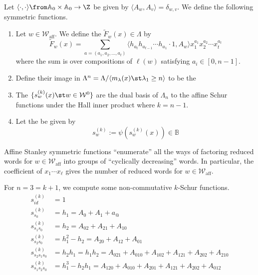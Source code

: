 \documentclass[11pt,leqno,oneside]{amsart}
\numberwithin{thm}{section}
\renewcommand{\W}{\mathcal{W}}
\newcommand{\Waff}{\W_{\text{aff}}}
\newcommand{\A}{\mathbb{A}}
\newcommand{\B}{\mathbb{B}}
\newcommand{\sym}{\Lambda}
\begin{document}
\begin{defn}\label{k-schur-def-1}
  Let \(\langle \cdot, \cdot \rangle \from \A_0 \times \A_0 \to
    \Z\) be given by \(\langle A_w, A_v \rangle = \delta_{w,v}\). We
    define the following symmetric functions.
  \begin{enumerate}
  \item Let \(w \in \Waff\). We define the  \(\tilde{F}_w(x) \in \sym\) by
    \[ \tilde{F}_w(x) = \sum_{a = (a_1, a_2, \ldots, a_t)} \langle
      h_{a_t} h_{a_{t-1}} \cdots h_{a_1} \cdot 1, A_w \rangle
      x_1^{a_1} x_2^{a_2} \cdots x_t^{a_t}
    \]
    where the sum is over compositions of \(\ell(w)\) satisfying
    \(a_i \in [0,n-1]\).
  \item Define their image in \(\sym^n = \sym/\langle m_\lambda(x) \st
    \lambda_1 \geq n\rangle\) to be the 
  \item The  \(\{s_w^{(k)}(x) \st w \in \W^0\}\)
  are the dual basis of \(\sym_n\) to the affine Schur functions under
  the Hall inner product where \(k = n-1\).
  \item Let the  be given
    by \[
      s_w^{(k)} := \psi(s_w^{(k)}(x)) \in \B
    \]
  \end{enumerate}
\end{defn}
\begin{rmk}
  Affine Stanley symmetric functions ``enumerate'' all the ways of
  factoring reduced words for \(w \in \Waff\) into groups of
  ``cyclically decreasing'' words. In particular, the coefficient of \(x_1
  \cdots x_\ell\) gives the number of reduced words for \(w \in \Waff\).
\end{rmk}
\begin{example}
  For \(n=3=k+1\), we compute some non-commutative \(k\)-Schur functions.
  \begin{align*}
    s_{id}^{(k)} & = 1 \\
    s_{s_0}^{(k)} & = h_1 = A_0+A_1+a_@ \\
    s_{s_1 s_0}^{(k)} & = h_2 = A_{02}+A_{21}+A_{10}\\
    s_{s_2 s_0}^{(k)} & = h_1^2-h_2=A_{20}+A_{12}+A_{01}\\
    s_{s_2 s_1 s_0}^{(k)} & = h_2h_1 = h_1 h_2 = A_{021}+A_{010}+A_{102}+A_{121}+A_{202}+A_{210}\\
    s_{s_1 s_2 s_0}^{(k)} & = h_1^3-h_2 h_1 = A_{120}+A_{010}+A_{201}+A_{121}+A_{202}+A_{012}
  \end{align*}
\end{example}
\end{document}
